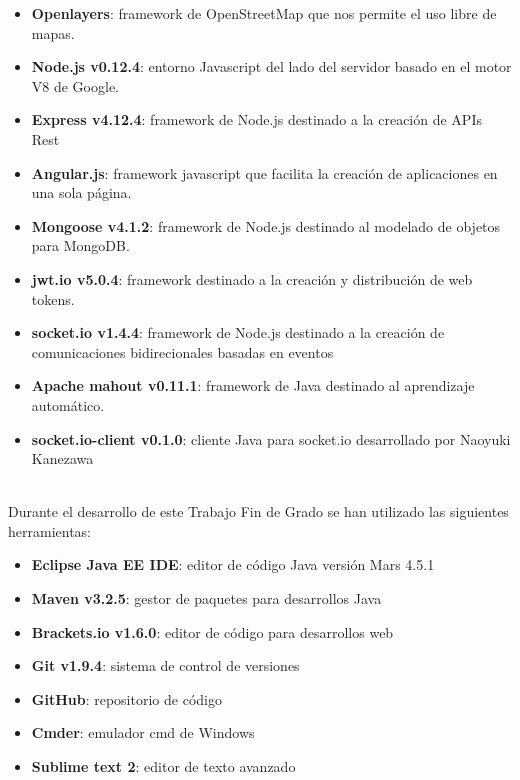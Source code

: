 \begin{itemize}
       \item {\bfseries Openlayers}: framework de OpenStreetMap que nos permite el uso libre de mapas.
       \item {\bfseries Node.js v0.12.4}: entorno Javascript del lado del servidor basado en el motor V8 de Google. 
       \item {\bfseries Express v4.12.4}: framework de Node.js destinado a la creación de APIs Rest
       \item {\bfseries Angular.js}: framework javascript que facilita la creación de aplicaciones en una sola página. 
       \item {\bfseries Mongoose v4.1.2}: framework de Node.js destinado al modelado de objetos para MongoDB.
       \item {\bfseries jwt.io v5.0.4}: framework destinado a la creación y distribución de web tokens. 
       \item {\bfseries socket.io v1.4.4}: framework de Node.js destinado a la creación de comunicaciones bidirecionales basadas en eventos
       \item {\bfseries Apache mahout v0.11.1}: framework de Java destinado al aprendizaje automático.
       \item {\bfseries socket.io-client v0.1.0}: cliente Java para socket.io desarrollado por Naoyuki Kanezawa
\end{itemize}
    
\\

Durante el desarrollo de este Trabajo Fin de Grado se han utilizado las siguientes herramientas:

\begin{itemize}
       \item {\bfseries Eclipse Java EE IDE}: editor de código Java versión Mars 4.5.1
       \item {\bfseries Maven v3.2.5}: gestor de paquetes para desarrollos Java
       \item {\bfseries Brackets.io v1.6.0}: editor de código para desarrollos web
       \item {\bfseries Git v1.9.4}: sistema de control de versiones
       \item {\bfseries GitHub}: repositorio de código
       \item {\bfseries Cmder}: emulador cmd de Windows 
       \item {\bfseries Sublime text 2}: editor de texto avanzado
\end{itemize}

